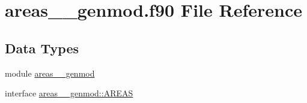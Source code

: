 \hypertarget{areas____genmod_8f90}{\section{areas\+\_\+\+\_\+genmod.\+f90 File Reference}
\label{areas____genmod_8f90}
}
\subsection*{Data Types}
\begin{DoxyCompactItemize}
\item 
module \hyperlink{classareas____genmod}{areas\+\_\+\+\_\+genmod}
\item 
interface \hyperlink{interfaceareas____genmod_1_1AREAS}{areas\+\_\+\+\_\+genmod\+::\+A\+R\+E\+A\+S}
\end{DoxyCompactItemize}
